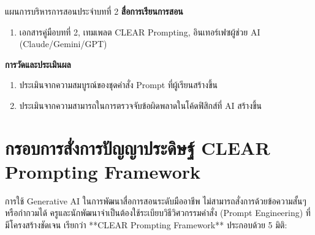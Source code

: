 \begin{teachingplan}{แผนการบริหารการสอนประจำบทที่ 2}
\noindent\textbf{สื่อการเรียนการสอน}
\begin{enumerate}[leftmargin=1.5em, itemsep=2pt]
    \item เอกสารคู่มือบทที่ 2, เทมเพลต CLEAR Prompting, อินเทอร์เฟซผู้ช่วย AI (Claude/Gemini/GPT)
\end{enumerate}

\noindent\textbf{การวัดและประเมินผล}
\begin{enumerate}[leftmargin=1.5em, itemsep=2pt]
    \item ประเมินจากความสมบูรณ์ของชุดคำสั่ง Prompt ที่ผู้เรียนสร้างขึ้น
    \item ประเมินจากความสามารถในการตรวจจับข้อผิดพลาดในโค้ดฟิสิกส์ที่ AI สร้างขึ้น
\end{enumerate}
\end{teachingplan}

\newpage

\section{กรอบการสั่งการปัญญาประดิษฐ์ CLEAR Prompting Framework}
การใช้ Generative AI ในการพัฒนาสื่อการสอนระดับมืออาชีพ ไม่สามารถสั่งการด้วยข้อความสั้นๆ หรือกำกวมได้ ครูและนักพัฒนาจำเป็นต้องใช้ระเบียบวิธีวิศวกรรมคำสั่ง (Prompt Engineering) ที่มีโครงสร้างชัดเจน เรียกว่า **CLEAR Prompting Framework** ประกอบด้วย 5 มิติ:

